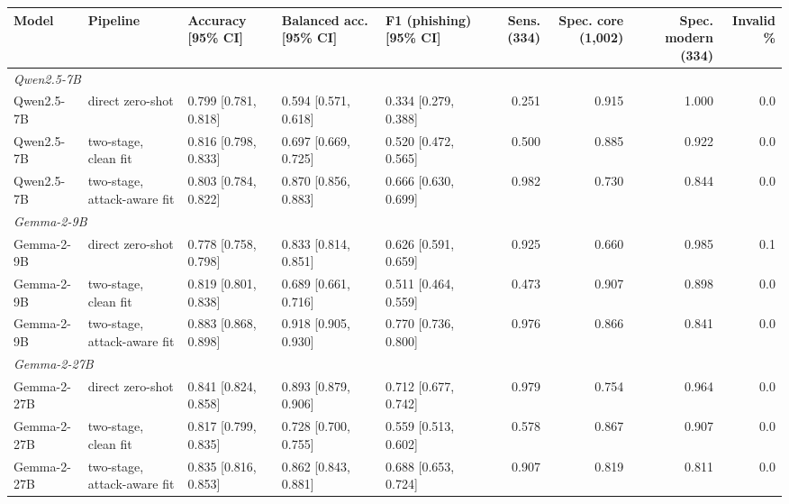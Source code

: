 \begin{tabular}{lllllrrrr}
\toprule
Model & Pipeline & Accuracy [95\% CI] & Balanced acc. [95\% CI] & F1 (phishing) [95\% CI] & Sens. (334) & Spec. core (1,002) & Spec. modern (334) & Invalid \% \\
\midrule
\multicolumn{9}{l}{\textit{Qwen2.5-7B}} \\
Qwen2.5-7B & direct zero-shot & 0.799 [0.781, 0.818] & 0.594 [0.571, 0.618] & 0.334 [0.279, 0.388] & 0.251 & 0.915 & 1.000 & 0.0 \\
Qwen2.5-7B & two-stage, clean fit & 0.816 [0.798, 0.833] & 0.697 [0.669, 0.725] & 0.520 [0.472, 0.565] & 0.500 & 0.885 & 0.922 & 0.0 \\
Qwen2.5-7B & two-stage, attack-aware fit & 0.803 [0.784, 0.822] & 0.870 [0.856, 0.883] & 0.666 [0.630, 0.699] & 0.982 & 0.730 & 0.844 & 0.0 \\
\midrule
\multicolumn{9}{l}{\textit{Gemma-2-9B}} \\
Gemma-2-9B & direct zero-shot & 0.778 [0.758, 0.798] & 0.833 [0.814, 0.851] & 0.626 [0.591, 0.659] & 0.925 & 0.660 & 0.985 & 0.1 \\
Gemma-2-9B & two-stage, clean fit & 0.819 [0.801, 0.838] & 0.689 [0.661, 0.716] & 0.511 [0.464, 0.559] & 0.473 & 0.907 & 0.898 & 0.0 \\
Gemma-2-9B & two-stage, attack-aware fit & 0.883 [0.868, 0.898] & 0.918 [0.905, 0.930] & 0.770 [0.736, 0.800] & 0.976 & 0.866 & 0.841 & 0.0 \\
\midrule
\multicolumn{9}{l}{\textit{Gemma-2-27B}} \\
Gemma-2-27B & direct zero-shot & 0.841 [0.824, 0.858] & 0.893 [0.879, 0.906] & 0.712 [0.677, 0.742] & 0.979 & 0.754 & 0.964 & 0.0 \\
Gemma-2-27B & two-stage, clean fit & 0.817 [0.799, 0.835] & 0.728 [0.700, 0.755] & 0.559 [0.513, 0.602] & 0.578 & 0.867 & 0.907 & 0.0 \\
Gemma-2-27B & two-stage, attack-aware fit & 0.835 [0.816, 0.853] & 0.862 [0.843, 0.881] & 0.688 [0.653, 0.724] & 0.907 & 0.819 & 0.811 & 0.0 \\
\bottomrule
\end{tabular}

